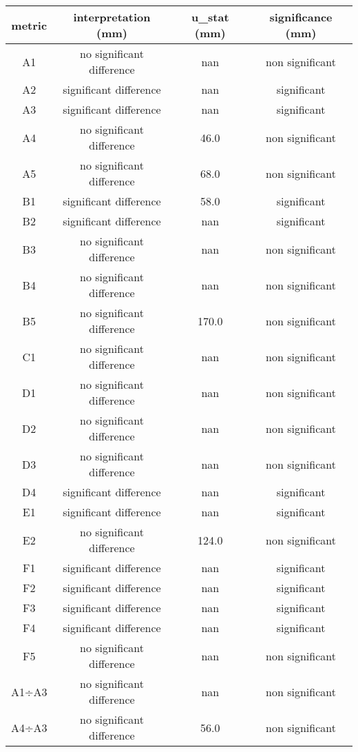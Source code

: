 \normalsize \newpage
\small\centering\begin{table}[H]
\centering
\begin{tabular}{|c|c|c|c|}
\hline
metric & interpretation (mm) & u\_stat (mm) & significance (mm) \\ 
\hline
A1 & no significant difference & nan & non significant \\ 
A2 & significant difference & nan & significant \\ 
A3 & significant difference & nan & significant \\ 
A4 & no significant difference & 46.0 & non significant \\ 
A5 & no significant difference & 68.0 & non significant \\ 
B1 & significant difference & 58.0 & significant \\ 
B2 & significant difference & nan & significant \\ 
B3 & no significant difference & nan & non significant \\ 
B4 & no significant difference & nan & non significant \\ 
B5 & no significant difference & 170.0 & non significant \\ 
C1 & no significant difference & nan & non significant \\ 
D1 & no significant difference & nan & non significant \\ 
D2 & no significant difference & nan & non significant \\ 
D3 & no significant difference & nan & non significant \\ 
D4 & significant difference & nan & significant \\ 
E1 & significant difference & nan & significant \\ 
E2 & no significant difference & 124.0 & non significant \\ 
F1 & significant difference & nan & significant \\ 
F2 & significant difference & nan & significant \\ 
F3 & significant difference & nan & significant \\ 
F4 & significant difference & nan & significant \\ 
F5 & no significant difference & nan & non significant \\ 
A1÷A3 & no significant difference & nan & non significant \\ 
A4÷A3 & no significant difference & 56.0 & non significant \\ 

\end{tabular}
\end{table}
